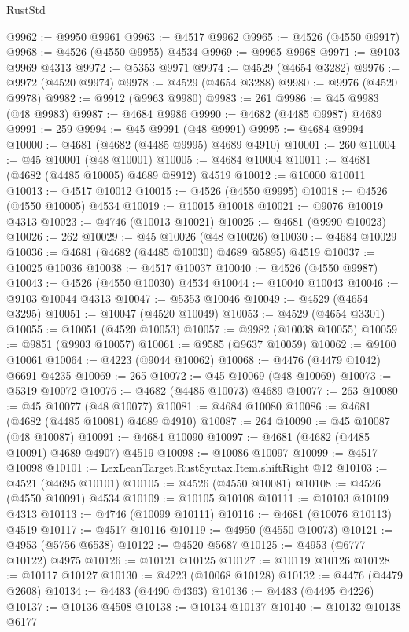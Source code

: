 \begin{lexlean}{RustStd}
\begin{coremodule}
@9962 := @9950 @9961
@9963 := @4517 @9962
@9965 := @4526 (@4550 @9917)
@9968 := @4526 (@4550 @9955) @4534
@9969 := @9965 @9968
@9971 := @9103 @9969 @4313
@9972 := @5353 @9971
@9974 := @4529 (@4654 @3282)
@9976 := @9972 (@4520 @9974)
@9978 := @4529 (@4654 @3288)
@9980 := @9976 (@4520 @9978)
@9982 := @9912 (@9963 @9980)
@9983 := 261
@9986 := @45 @9983 (@48 @9983)
@9987 := @4684 @9986
@9990 := @4682 (@4485 @9987) @4689
@9991 := 259
@9994 := @45 @9991 (@48 @9991)
@9995 := @4684 @9994
@10000 := @4681 (@4682 (@4485 @9995) @4689 @4910)
@10001 := 260
@10004 := @45 @10001 (@48 @10001)
@10005 := @4684 @10004
@10011 := @4681 (@4682 (@4485 @10005) @4689 @8912) @4519
@10012 := @10000 @10011
@10013 := @4517 @10012
@10015 := @4526 (@4550 @9995)
@10018 := @4526 (@4550 @10005) @4534
@10019 := @10015 @10018
@10021 := @9076 @10019 @4313
@10023 := @4746 (@10013 @10021)
@10025 := @4681 (@9990 @10023)
@10026 := 262
@10029 := @45 @10026 (@48 @10026)
@10030 := @4684 @10029
@10036 := @4681 (@4682 (@4485 @10030) @4689 @5895) @4519
@10037 := @10025 @10036
@10038 := @4517 @10037
@10040 := @4526 (@4550 @9987)
@10043 := @4526 (@4550 @10030) @4534
@10044 := @10040 @10043
@10046 := @9103 @10044 @4313
@10047 := @5353 @10046
@10049 := @4529 (@4654 @3295)
@10051 := @10047 (@4520 @10049)
@10053 := @4529 (@4654 @3301)
@10055 := @10051 (@4520 @10053)
@10057 := @9982 (@10038 @10055)
@10059 := @9851 (@9903 @10057)
@10061 := @9585 (@9637 @10059)
@10062 := @9100 @10061
@10064 := @4223 (@9044 @10062)
@10068 := @4476 (@4479 @1042) @6691 @4235
@10069 := 265
@10072 := @45 @10069 (@48 @10069)
@10073 := @5319 @10072
@10076 := @4682 (@4485 @10073) @4689
@10077 := 263
@10080 := @45 @10077 (@48 @10077)
@10081 := @4684 @10080
@10086 := @4681 (@4682 (@4485 @10081) @4689 @4910)
@10087 := 264
@10090 := @45 @10087 (@48 @10087)
@10091 := @4684 @10090
@10097 := @4681 (@4682 (@4485 @10091) @4689 @4907) @4519
@10098 := @10086 @10097
@10099 := @4517 @10098
@10101 := LexLeanTarget.RustSyntax.Item.shiftRight @12
@10103 := @4521 (@4695 @10101)
@10105 := @4526 (@4550 @10081)
@10108 := @4526 (@4550 @10091) @4534
@10109 := @10105 @10108
@10111 := @10103 @10109 @4313
@10113 := @4746 (@10099 @10111)
@10116 := @4681 (@10076 @10113) @4519
@10117 := @4517 @10116
@10119 := @4950 (@4550 @10073)
@10121 := @4953 (@5756 @6538)
@10122 := @4520 @5687
@10125 := @4953 (@6777 @10122) @4975
@10126 := @10121 @10125
@10127 := @10119 @10126
@10128 := @10117 @10127
@10130 := @4223 (@10068 @10128)
@10132 := @4476 (@4479 @2608)
@10134 := @4483 (@4490 @4363)
@10136 := @4483 (@4495 @4226)
@10137 := @10136 @4508
@10138 := @10134 @10137
@10140 := @10132 @10138 @6177

\end{coremodule}
\end{lexlean}
